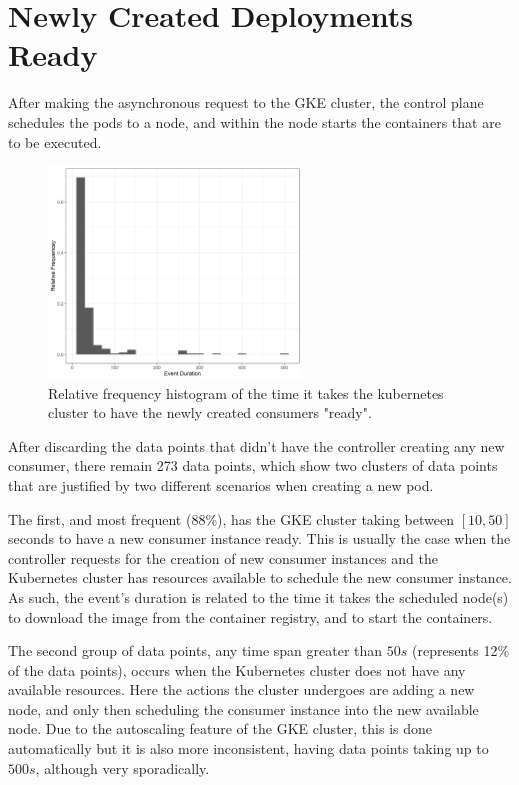 \section{Newly Created Deployments Ready}

After making the asynchronous request to the GKE cluster, the control plane
schedules the pods to a node, and within the node starts the containers that are
to be executed.

\begin{figure}[htb!]
\centering
\includegraphics[width=0.6\textwidth]{images/integration/delta3.png}
\caption{Relative frequency histogram of the time it takes the kubernetes cluster to have the newly created consumers "ready".}
\label{fig:controller_result_kubernetes}
\end{figure}

After discarding the data points that didn't have the controller creating any
new consumer, there remain 273 data points, which show two clusters of data
points that are justified by two different scenarios when creating a new pod. 

The first, and most frequent (88\%), has the GKE cluster taking between $[10,
50]$ seconds to have a new consumer instance ready. This is usually the case when the
controller requests for the creation of new consumer instances and the
Kubernetes cluster has resources available to schedule the new consumer
instance. As such, the event's duration is related to the time it takes the
scheduled node(s) to download the image from the container registry, and to
start the containers.

The second group of data points, any time span greater than $50s$ (represents
12\% of the data points), occurs when the Kubernetes cluster does not have any
available resources. Here the actions the cluster undergoes are adding a new
node, and only then scheduling the consumer instance into the new available
node. Due to the autoscaling feature of the GKE cluster, this is done
automatically but it is also more inconsistent, having data points taking up to
$500s$, although very sporadically.


